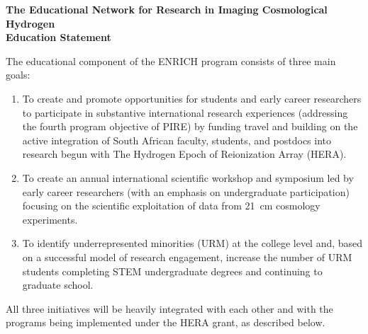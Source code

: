 \documentclass[preprint,11pt]{aastex}
\begin{document}
\clearpage
\setcounter{page}{1}

\setlength{\parindent}{0cm}
\textbf{\large The Educational Network for Research in Imaging Cosmological Hydrogen}\\
\textbf{Education Statement}
\vspace{6pt}
\setlength{\parindent}{17pt}

The educational component of the ENRICH program consists of three main goals:

\begin{enumerate}
\item To create and promote opportunities for students and early career researchers to participate in substantive international research experiences (addressing the fourth program objective of PIRE) by funding travel and building on the active integration of South African faculty, students, and postdocs into research begun with The Hydrogen Epoch of Reionization Array (HERA).

\item To create an annual international scientific workshop and symposium led by early career researchers (with an emphasis on undergraduate participation) focusing on the scientific exploitation of data from 21\, cm cosmology experiments.

\item To identify underrepresented minorities (URM) at the college level and, based on a successful model of research engagement, increase the number of URM students completing STEM undergraduate degrees and continuing to graduate school.
\end{enumerate}

All three initiatives will be heavily integrated with each other and with the programs being implemented under the HERA grant, as described below.  

\end{document}
